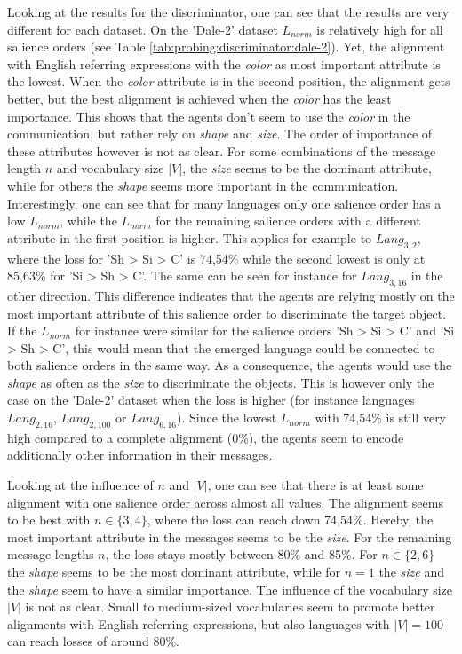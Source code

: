 Looking at the results for the discriminator, one can see that the results are very different for each dataset.
On the 'Dale-2' dataset $L_{norm}$ is relatively high for all salience orders (see Table \ref{tab:probing:discriminator:dale-2}).
Yet, the alignment with English referring expressions with the \emph{color} as most important attribute is the lowest.
When the \emph{color} attribute is in the second position, the alignment gets better, but the best alignment is achieved when the \emph{color} has the least importance.
This shows that the agents don't seem to use the \emph{color} in the communication, but rather rely on \emph{shape} and \emph{size}.
The order of importance of these attributes however is not as clear.
For some combinations of the message length $n$ and vocabulary size $|V|$, the \emph{size} seems to be the dominant attribute, while for others the \emph{shape} seems more important in the communication.
Interestingly, one can see that for many languages only one salience order has a low $L_{norm}$, while the $L_{norm}$ for the remaining salience orders with a different attribute in the first position is higher.
This applies for example to $Lang_{3,2}$, where the loss for 'Sh > Si > C' is 74,54\% while the second lowest is only at 85,63\% for 'Si > Sh > C'.
The same can be seen for instance for $Lang_{3,16}$ in the other direction.
This difference indicates that the agents are relying mostly on the most important attribute of this salience order to discriminate the target object.
If the $L_{norm}$ for instance were similar for the salience orders 'Sh > Si > C' and 'Si > Sh > C', this would mean that the emerged language could be connected to both salience orders in the same way.
As a consequence, the agents would use the \emph{shape} as often as the \emph{size} to discriminate the objects.
This is however only the case on the 'Dale-2' dataset when the loss is higher (for instance languages $Lang_{2,16}$, $Lang_{2,100}$ or $Lang_{6,16}$).
Since the lowest $L_{norm}$ with 74,54\% is still very high compared to a complete alignment (0\%), the agents seem to encode additionally other information in their messages.

Looking at the influence of $n$ and $|V|$, one can see that there is at least some alignment with one salience order across almost all values.
The alignment seems to be best with $n \in \{3,4\}$, where the loss can reach down 74,54\%.
Hereby, the most important attribute in the messages seems to be the \emph{size}.
For the remaining message lengths $n$, the loss stays mostly between 80\% and 85\%.
For $n \in \{2,6\}$ the \emph{shape} seems to be the most dominant attribute, while for $n=1$ the \emph{size} and the \emph{shape} seem to have a similar importance.
The influence of the vocabulary size $|V|$ is not as clear.
Small to medium-sized vocabularies seem to promote better alignments with English referring expressions, but also languages with $|V|=100$ can reach losses of around 80\%.

